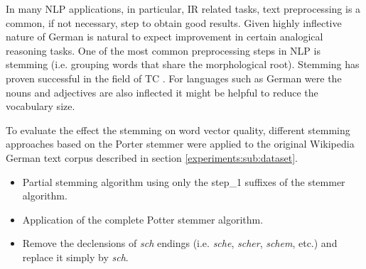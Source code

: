 In many \ac{NLP} applications, in particular, \ac{IR} related tasks,  text preprocessing is a common, if not
necessary, step to obtain good results. Given highly inflective nature of
German is natural to expect improvement in
certain analogical reasoning tasks.  One of the most common preprocessing steps in NLP is stemming (i.e. grouping
words that share the morphological root). Stemming has proven successful in
the field of \ac{TC} \cite{Sebastiani02}. For languages such as  German were the nouns and
adjectives are also inflected it might be helpful to reduce the vocabulary
size.  

To evaluate the effect the stemming on word vector quality, different
stemming approaches based on the Porter stemmer \cite{Porter80} were applied  to the original Wikipedia
German text corpus described in section \ref{experiments:sub:dataset}.

\begin{itemize} 
\item Partial stemming algorithm using only the step\_1 suffixes of the
  stemmer algorithm.
\item Application of the complete Potter stemmer algorithm.
\item Remove the declensions of  \textit{sch} endings (i.e. \textit{sche}, \textit{scher},
   \textit{schem}, etc.)  and replace it simply by \textit{sch}.
\end{itemize} 



